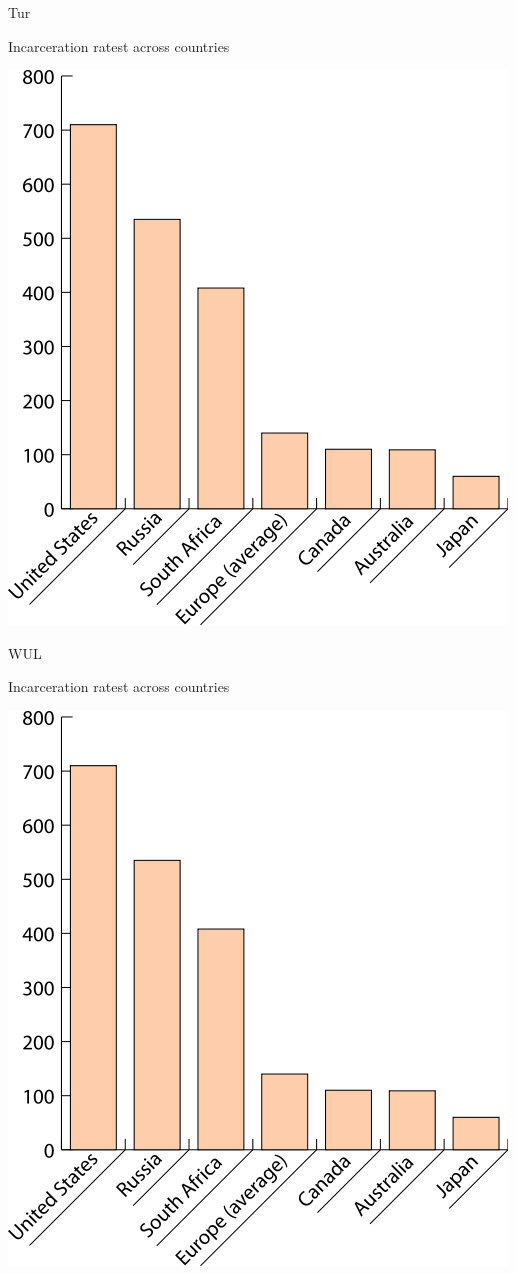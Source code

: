 \begin{chart}{T}{ur}
\caption{Incarceration ratest across countries}
\label{chart:incarceration}
\includegraphics[width=\chartwidth,height=\chartheight]{incarceration}  
\end{chart}

\begin{chart}{W}{UL}
\caption{Incarceration ratest across countries}
\label{chart:incarceration}
\includegraphics[width=\chartwidth,height=\chartheight]{incarceration}  
\end{chart}

